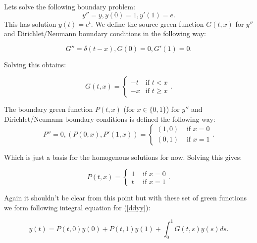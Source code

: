 \documentclass[a4paper,12pt]{article}
\begin{document}
\begin{example}[$y''=y$]
    Lets solve the following boundary problem:
    \begin{equation} \label{ddyy}
        y'' = y, y(0) = 1, y'(1)=e.
    \end{equation}
    This has solution $y(t) = e^{t}$. We define the source green function $G(t,x)$
    for $y''$ and Dirichlet/Neumann boundary conditions in the following way:

    \begin{equation}
        G''= \delta(t-x),G(0)=0,G'(1)=0.
    \end{equation}

    Solving this obtains:

    \begin{equation}
        G(t,x) =
        \begin{cases}
            -t & \text{if } t <  x   \\
            -x & \text{if } t \ge  x
        \end{cases}.
    \end{equation}

    The boundary green function $P(t,x)$ (for $x \in \{0,1\}$)
    for $y''$ and Dirichlet/Neumann boundary conditions is defined
    the following way:
    \begin{equation}
        P'' = 0, \left(P(0,x),P'(1,x) \right)=
        \begin{cases}
            (1 , 0) & \text{ if } x=0 \\
            (0 , 1) & \text{ if } x=1
        \end{cases}.
    \end{equation}

    Which is just a basis for the homogenous solutions for now. Solving
    this gives:

    \begin{equation}
        P(t,x) =
        \begin{cases}
            1 & \text{ if } x=0 \\
            t & \text{ if } x=1
        \end{cases}.
    \end{equation}

    Again it shouldn't be clear from this point but with these set of green
    functions we form following integral equation for (\ref{ddyy}):

    \begin{equation} \label{int ddyy}
        y(t) = P(t,0)y(0) + P(t,1)y(1) + \int_{0}^{1}G(t,s) y(s) ds.
    \end{equation}


\end{example}
\end{document}
